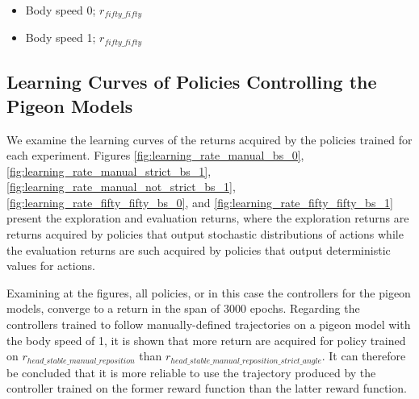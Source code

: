 \begin{itemize}
    \item Body speed 0; $r_{fifty\_fifty}$

    \item Body speed 1; $r_{fifty\_fifty}$

  \end{itemize}

\subsection{Learning Curves of Policies Controlling the Pigeon Models}
  We examine the learning curves of the returns acquired by the policies trained for each experiment.
  Figures \ref{fig:learning_rate_manual_bs_0}, \ref{fig:learning_rate_manual_strict_bs_1}, \ref{fig:learning_rate_manual_not_strict_bs_1}, \ref{fig:learning_rate_fifty_fifty_bs_0}, and \ref{fig:learning_rate_fifty_fifty_bs_1} present the exploration and evaluation returns, where the exploration returns are returns acquired by policies that output stochastic distributions of actions while the evaluation returns are such acquired by policies that output deterministic values for actions.

  Examining at the figures, all policies, or in this case the controllers for the pigeon models, converge to a return in the span of 3000 epochs.
  Regarding the controllers trained to follow manually-defined trajectories on a pigeon model with the body speed of 1, it is shown that more return are acquired for policy trained on $r_{head\_stable\_manual\_reposition}$ than $r_{head\_stable\_manual\_reposition\_strict\_angle}$.
  It can therefore be concluded that it is more reliable to use the trajectory produced by the controller trained on the former reward function than the latter reward function.

